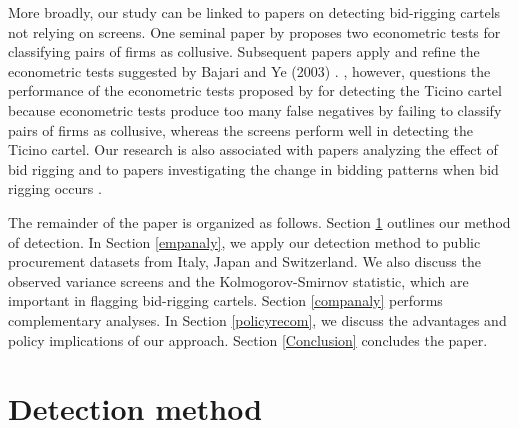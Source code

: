 \documentclass[a4paper,11pt]{article}
\begin{document}
	More broadly, our study can be linked to papers on detecting bid-rigging cartels not relying on screens. One seminal paper by \citet{Bajari2003} proposes two econometric tests for classifying pairs of firms as collusive. Subsequent papers apply and refine the econometric tests suggested by Bajari and Ye (2003) \citep[see][]{Jakobsson2007, Aryal2013, Chotibhongs2012a, Chotibhongs2012b, Imhof2017b, bergman2020interactions}. \citet{Imhof2017b}, however, questions the performance of the econometric tests proposed by \citet{Bajari2003} for detecting the Ticino cartel because econometric tests produce too many false negatives by failing to classify pairs of firms as collusive, whereas the screens perform well in detecting the Ticino cartel. Our research is also associated with papers analyzing the effect of bid rigging \citep[][]{Pesendorfer2000, Ishii2009, clark2018bid} and to papers investigating the change in bidding patterns when bid rigging occurs \citep[][]{Porter1993, Porter1999}.
	
	The remainder of the paper is organized as follows. Section \ref{detecmeth} outlines our method of detection. In Section \ref{empanaly}, we apply our detection method to public procurement datasets from Italy, Japan and Switzerland. We also discuss the observed variance screens and the Kolmogorov-Smirnov statistic, which are important in flagging bid-rigging cartels. Section \ref{companaly} performs complementary analyses. In Section \ref{policyrecom}, we discuss the advantages and policy implications of our approach. Section \ref{Conclusion} concludes the paper. 
	
	\section{Detection method}\label{detecmeth}
	
\end{document}
